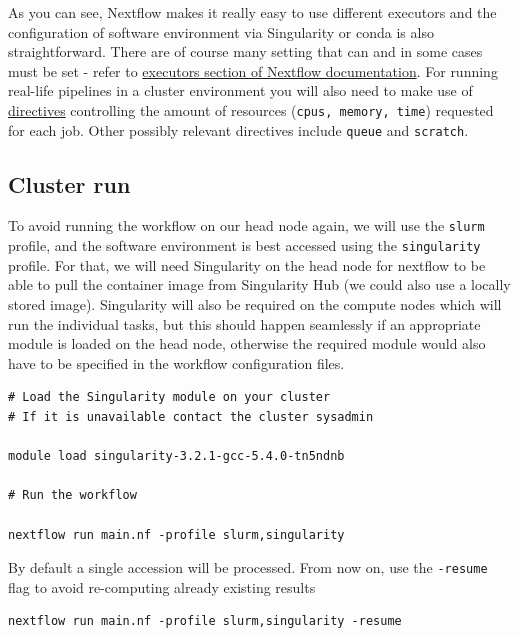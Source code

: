 As you can see, Nextflow makes it really easy to use different executors and the configuration of software environment via Singularity or conda is also straightforward. There are of course many setting that can and in some cases must be set - refer to \href{https://www.nextflow.io/docs/latest/executor.html}{executors section of Nextflow documentation}. 
For running real-life pipelines in a cluster environment you will also need to make use of \href{https://www.nextflow.io/docs/latest/process.html#directives}{directives} controlling the amount of resources (\texttt{cpus, memory, time}) requested for each job. Other possibly relevant directives include \texttt{queue} and \texttt{scratch}.

\subsection{Cluster run}

\begin{steps}
To avoid running the workflow on our head node again, we will use the \texttt{slurm} profile, and the software environment is best accessed using the \texttt{singularity} profile. 
For that, we will need Singularity on the head node for nextflow to be able to pull the container image from Singularity Hub (we could also use a locally stored image). Singularity will also be required on the compute nodes which will run the individual tasks, but this should happen seamlessly if an appropriate module is loaded on the head node, otherwise the required module would also have to be specified in the workflow configuration files. 
\begin{lstlisting}
# Load the Singularity module on your cluster
# If it is unavailable contact the cluster sysadmin

module load singularity-3.2.1-gcc-5.4.0-tn5ndnb

# Run the workflow

nextflow run main.nf -profile slurm,singularity
\end{lstlisting}
By default a single accession will be processed. 
From now on, use the \texttt{-resume} flag to avoid re-computing already existing results
\begin{lstlisting}
nextflow run main.nf -profile slurm,singularity -resume
\end{lstlisting}
\end{steps}

